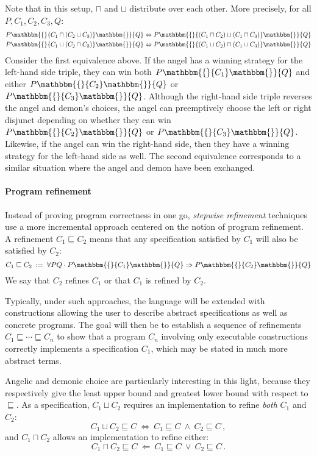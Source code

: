 \documentclass[format=sigplan,authordraft]{acmart}
\newcommand{\htr}[3]{{ {#1} \mathbbm{\{} {#2} \mathbbm{\}} {#3} }}
\begin{document}
Note that in this setup,
$\sqcap$ and $\sqcup$ distribute over each other.
More precisely, for all $P, C_1, C_2, C_3, Q$:
\begin{align*}
  \htr{P}{C_1 \sqcap (C_2 \sqcup C_3)}{Q} &\Leftrightarrow
    \htr{P}{(C_1 \sqcap C_2) \sqcup (C_1 \sqcap C_3)}{Q} \\
  \htr{P}{C_1 \sqcup (C_2 \sqcap C_3)}{Q} &\Leftrightarrow
    \htr{P}{(C_1 \sqcup C_2) \sqcap (C_1 \sqcup C_3)}{Q}
\end{align*}
Consider the first equivalence above.
If the angel has a winning strategy for
the left-hand side triple,
they can win both $\htr{P}{C_1}{Q}$
and either $\htr{P}{C_2}{Q}$ or $\htr{P}{C_3}{Q}$.
Although the right-hand side triple
reverses the angel and demon's choices,
the angel can preemptively choose the left or right
disjunct depending on whether they can win
$\htr{P}{C_2}{Q}$ or $\htr{P}{C_3}{Q}$.
Likewise, if the angel can win the right-hand side,
then they have a winning strategy for the left-hand side as well.
The second equivalence corresponds to a similar situation
where the angel and demon have been exchanged.


\paragraph{Program refinement} %

Instead of proving program correctness in one go,
\emph{stepwise refinement} techniques use a more incremental approach
centered on the notion of program refinement.
A refinement $C_1 \sqsubseteq C_2$
means that any specification satisfied by $C_1$
will also be satisfied by $C_2$:
\[
    C_1 \sqsubseteq C_2 \: := \:
    \forall P Q \cdot
      \htr{P}{C_1}{Q} \Rightarrow
      \htr{P}{C_2}{Q}
\]
We say that $C_2$ refines $C_1$
or that $C_1$ is refined by $C_2$.

Typically,
under such approaches,
the language will be extended with constructions
allowing the user to describe
abstract specifications as well as
concrete programs.
The goal will then be to establish
a sequence of refinements
$C_1 \sqsubseteq \cdots \sqsubseteq C_n$
to show that a program $C_n$ involving
only executable constructions
correctly implements a specification $C_1$,
which may be stated in much more abstract terms.

Angelic and demonic choice
are particularly interesting in this light,
because they respectively give the
least upper bound and greatest lower bound
with respect to $\sqsubseteq$.
As a specification, $C_1 \sqcup C_2$
requires an implementation to refine
\emph{both} $C_1$ and $C_2$:
\[
    C_1 \sqcup C_2 \sqsubseteq C \: \Leftrightarrow \:
    C_1 \sqsubseteq C \: \wedge \: C_2 \sqsubseteq C \,,
\]
and $C_1 \sqcap C_2$
allows an implementation to refine
either:
\[
    C_1 \sqcap C_2 \sqsubseteq C \: \Leftarrow \:
    C_1 \sqsubseteq C \: \vee \: C_2 \sqsubseteq C \,.
\]
\end{document}
